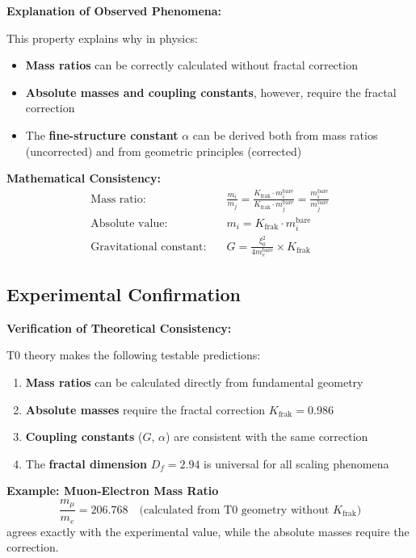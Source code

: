 \documentclass[12pt,a4paper]{article}
\begin{document}
	\begin{derivation}
		\textbf{Explanation of Observed Phenomena:}
		
		This property explains why in physics:
		
		\begin{itemize}
			\item \textbf{Mass ratios} can be correctly calculated without fractal correction
			\item \textbf{Absolute masses and coupling constants}, however, require the fractal correction
			\item The \textbf{fine-structure constant} $\alpha$ can be derived both from mass ratios (uncorrected) and from geometric principles (corrected)
		\end{itemize}
		
		\textbf{Mathematical Consistency:}
		\begin{align}
			\text{Mass ratio:} &\quad \frac{m_i}{m_j} = \frac{K_{\text{frak}} \cdot m_i^{\text{bare}}}{K_{\text{frak}} \cdot m_j^{\text{bare}}} = \frac{m_i^{\text{bare}}}{m_j^{\text{bare}}} \\
			\text{Absolute value:} &\quad m_i = K_{\text{frak}} \cdot m_i^{\text{bare}} \\
			\text{Gravitational constant:} &\quad G = \frac{\xi_0^2}{4 m_e^{\text{bare}}} \times K_{\text{frak}}
		\end{align}
	\end{derivation}
	
	\subsection{Experimental Confirmation}
	
	\begin{verification}
		\textbf{Verification of Theoretical Consistency:}
		
		T0 theory makes the following testable predictions:
		
		\begin{enumerate}
			\item \textbf{Mass ratios} can be calculated directly from fundamental geometry
			\item \textbf{Absolute masses} require the fractal correction $K_{\text{frak}} = 0.986$
			\item \textbf{Coupling constants} ($G$, $\alpha$) are consistent with the same correction
			\item The \textbf{fractal dimension} $D_f = 2.94$ is universal for all scaling phenomena
		\end{enumerate}
		
		\textbf{Example: Muon-Electron Mass Ratio}
		\begin{equation}
			\frac{m_\mu}{m_e} = 206.768 \quad \text{(calculated from T0 geometry without $K_{\text{frak}}$)}
		\end{equation}
		agrees exactly with the experimental value, while the absolute masses require the correction.
	\end{verification}
	
\end{document}
